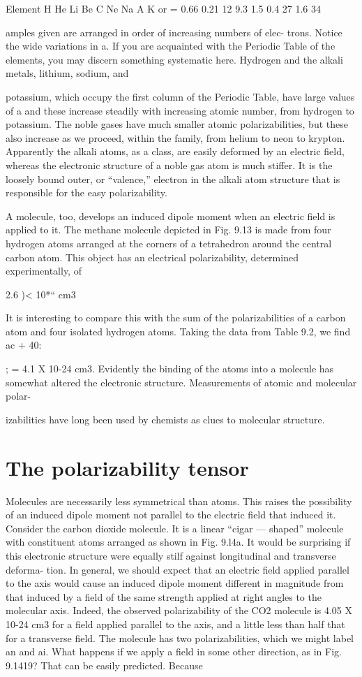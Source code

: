 {Element H He Li Be C Ne Na A K
or = 0.66 0.21 12 9.3 1.5 0.4 27 1.6 34

amples given are arranged in order of increasing numbers of elec-
trons. Notice the wide variations in a. If you are acquainted with
the Periodic Table of the elements, you may discern something systematic
here. Hydrogen and the alkali metals, lithium, sodium, and

potassium, which occupy the first column of the Periodic Table, have
large values of a and these increase steadily with increasing atomic
number, from hydrogen to potassium. The noble gases have much
smaller atomic polarizabilities, but these also increase as we proceed,
within the family, from helium to neon to krypton. Apparently the
alkali atoms, as a class, are easily deformed by an electric field,
whereas the electronic structure of a noble gas atom is much stiffer.
It is the loosely bound outer, or ``valence,'' electron in the alkali atom
structure that is responsible for the easy polarizability.

A molecule, too, develops an induced dipole moment when an
electric field is applied to it. The methane molecule depicted in
Fig. 9.13 is made from four hydrogen atoms arranged at the corners
of a tetrahedron around the central carbon atom. This object has
an electrical polarizability, determined experimentally, of

2.6 )< 10*`` cm3

It is interesting to compare this with the sum of the polarizabilities of
a carbon atom and four isolated hydrogen atoms. Taking the data
from Table 9.2, we find ac + 40:}; = 4.1 X 10-24 cm3. Evidently
the binding of the atoms into a molecule has somewhat altered the
electronic structure. Measurements of atomic and molecular polar-

izabilities have long been used by chemists as clues to molecular
structure.

\section{The polarizability tensor}

Molecules are necessarily less symmetrical than atoms. This raises
the possibility of an induced dipole moment not parallel to the electric
field that induced it. Consider the carbon dioxide molecule. It is
a linear ``cigar --- shaped'' molecule with constituent atoms arranged
as shown in Fig. 9.l4a. It would be surprising if this electronic structure
were equally stilf against longitudinal and transverse deforma-
tion. In general, we should expect that an electric field applied
parallel to the axis would cause an induced dipole moment different
in magnitude from that induced by a field of the same strength applied
at right angles to the molecular axis. Indeed, the observed
polarizability of the CO2 molecule is 4.05 X 10-24 cm3 for a field
applied parallel to the axis, and a little less than half that for a transverse
field. The molecule has two polarizabilities, which we might
label an and ai. What happens if we apply a field in some other
direction, as in Fig. 9.1419? That can be easily predicted. Because

